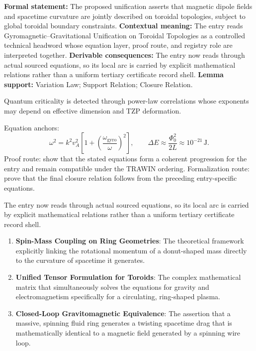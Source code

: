 \begingroup\footnotesize\setlength{\emergencystretch}{3em}\sloppy
\textbf{Formal statement:} The proposed unification asserts that magnetic dipole fields and spacetime curvature are jointly described on toroidal topologies, subject to global toroidal boundary constraints. \textbf{Contextual meaning:} The entry reads Gyromagnetic--Gravitational Unification on Toroidal Topologies as a controlled technical headword whose equation layer, proof route, and registry role are interpreted together. \textbf{Derivable consequences:} The entry now reads through actual sourced equations, so its local arc is carried by explicit mathematical relations rather than a uniform tertiary certificate record shell. \textbf{Lemma support:} Variation Law; Support Relation; Closure Relation.\par
\endgroup

Quantum criticality is detected through power-law correlations whose exponents may depend on effective dimension and TZP deformation.

Equation anchors:
\[
\omega^2=k^2v_A^2\left[1+\left(\frac{\omega_{\mathrm{gyro}}}{\omega}\right)^2\right],
\qquad
\Delta E\approx\frac{\Phi_0^2}{2L}\approx10^{-21}\,\mathrm{J}.
\]
Proof route: show that the stated equations form a coherent progression for the entry and remain compatible under the TRAWIN ordering. Formalization route: prove that the final closure relation follows from the preceding entry-specific equations.

The entry now reads through actual sourced equations, so its local arc is carried by explicit mathematical relations rather than a uniform tertiary certificate record shell.
\endgroup

\begin{enumerate}[leftmargin=1.6em,itemsep=6pt,topsep=4pt]
\item \textbf{Spin-Mass Coupling on Ring Geometries}: The theoretical framework explicitly linking the rotational momentum of a donut-shaped mass directly to the curvature of spacetime it generates.
\item \textbf{Unified Tensor Formulation for Toroids}: The complex mathematical matrix that simultaneously solves the equations for gravity and electromagnetism specifically for a circulating, ring-shaped plasma.
\item \textbf{Closed-Loop Gravitomagnetic Equivalence}: The assertion that a massive, spinning fluid ring generates a twisting spacetime drag that is mathematically identical to a magnetic field generated by a spinning wire loop.
\end{enumerate}

